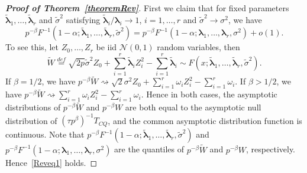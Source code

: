 \documentclass[times,sort&compress,3p]{elsarticle}
\newcommand{\bfsym}[1]{\ensuremath{\boldsymbol{#1}}}
\def\blambda {\bfsym {\lambda}}        \def\bLambda {\bfsym {\Lambda}}
\theoremstyle{plain}
\theoremstyle{definition}
\theoremstyle{remark}
\begin{document}
\begin{appendices}
\begin{proof}[\textbf{Proof of Theorem~\ref{theoremRev}}]
    First we claim that for fixed parameters $\tilde{\blambda}_1,\ldots, \tilde{\blambda}_r$ and $\tilde{\sigma}^2$ satisfying $\tilde{\blambda}_i/\blambda_i\to 1$, $i=1,\ldots,r$ and $\tilde{\sigma}^2\to \sigma^2$, we have
    \begin{equation}\label{Reveq1}
        p^{-\beta}F^{-1}(1-\alpha;\tilde{\blambda}_1,\ldots,\tilde{\blambda}_r,\tilde{\sigma}^2)=
        p^{-\beta}F^{-1}(1-\alpha;\blambda_1,\ldots,\blambda_r,\sigma^2)+o(1).
    \end{equation}
    To see this, let $Z_0,\ldots, Z_r$ be iid $\mathcal{N}(0,1)$ random variables, then
    $$
    \tilde{W}\overset{def}{=}\sqrt{2p}\tilde{\sigma}^2 Z_0
+
        \sum_{i=1}^r \tilde{\blambda}_i Z_i^2
            -
        \sum_{i=1}^r \tilde{\blambda}_i\sim F(x;\tilde{\blambda}_1,\ldots,\tilde{\blambda}_r,\tilde{\sigma}^2).
    $$
If $\beta=1/2$, we have
$
    p^{-\beta}\tilde{W}\rightsquigarrow
\sqrt{2}\sigma^2 Z_0 + \sum_{i=1}^r \omega_i Z_i^2 -\sum_{i=1}^r \omega_i
$.
If $\beta>1/2$, we have
$
    p^{-\beta}\tilde{W}\rightsquigarrow
\sum_{i=1}^r \omega_i Z_i^2 -\sum_{i=1}^r \omega_i.
$
    Hence in both cases, the asymptotic distributions of $p^{-\beta}\tilde{W}$ and $p^{-\beta}W$ are both equal to the asymptotic null distribution of $(\tau p^{\beta})^{-1}T_{CQ}$, and the common asymptotic distribution function is continuous.
Note that
$
        p^{-\beta}F^{-1}(1-\alpha;\tilde{\blambda}_1,\ldots,\tilde{\blambda}_r,\tilde{\sigma}^2)
    $
     and
$
        p^{-\beta}F^{-1}(1-\alpha;\blambda_1,\ldots,\blambda_r,\sigma^2)
    $
    are the quantiles of $p^{-\beta}\tilde{W}$ and $p^{-\beta}W$, respectively.
    Hence~\eqref{Reveq1} holds. 
    

\end{proof}
\end{appendices}
\end{document}

